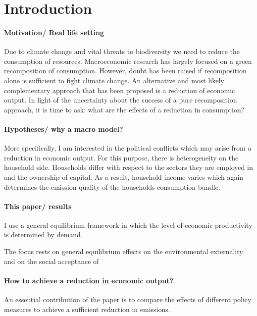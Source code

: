 \section{Introduction}

\paragraph{Motivation/ Real life setting}
Due to climate change and vital threats to biodiversity we need to reduce the consumption of resources. %
Macroeconomic research has largely focused on a green recomposition of consumption. However, doubt has been raised if recomposition alone is sufficient to fight climate change. An alternative and most likely complementary approach that has been proposed is a reduction of economic output. %
In light of the uncertainty about the success of a pure recomposition approach, it is time to ask: what are the effects of a reduction in consumption? 

\paragraph{Hypotheses/ why a macro model?}
More specifically, I am interested in the political conflicts which may arise from a reduction in economic output. For this purpose, there is heterogeneity on the household side. 
Households differ with respect to the sectors they are employed in and the ownership of capital. As a result, household income varies which again determines the emission-quality of the households consumption bundle.  




\paragraph{This paper/ results}
I use a general equilibrium framework in which the level of economic productivity is determined by demand. 

The focus rests on general equilibrium effects on the environmental externality and on the social acceptance of 


\paragraph{How to achieve a reduction in economic output?}
An essential contribution of the paper is to compare the effects of different policy measures to achieve a sufficient reduction in emissions. 